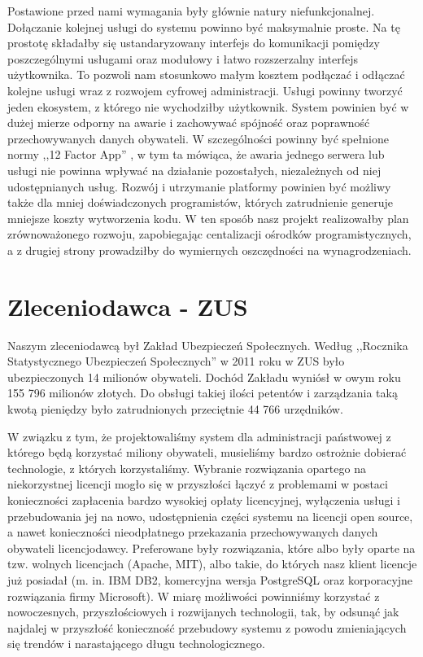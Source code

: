 \documentclass[licencjacka]{pracamgr}
\begin{document}
Postawione przed nami wymagania były głównie natury niefunkcjonalnej. Dołączanie kolejnej usługi do systemu
powinno być maksymalnie proste. Na tę prostotę składałby się ustandaryzowany interfejs do komunikacji pomiędzy
poszczególnymi usługami oraz modułowy i łatwo rozszerzalny interfejs użytkownika.
To pozwoli nam stosunkowo małym kosztem podłączać i odłączać kolejne usługi wraz z
rozwojem cyfrowej administracji. Usługi powinny tworzyć jeden ekosystem, z którego nie wychodziłby użytkownik. System
powinien być w dużej mierze odporny na awarie i zachowywać spójność oraz poprawność przechowywanych danych obywateli.
W szczególności powinny być spełnione normy ,,12 Factor App'' \cite{tfa}, w tym ta mówiąca, że awaria jednego serwera
lub usługi nie powinna wpływać na działanie pozostałych, niezależnych od niej udostępnianych usług.
Rozwój i utrzymanie platformy powinien być możliwy także dla mniej doświadczonych
programistów, których zatrudnienie generuje mniejsze koszty wytworzenia kodu. W ten sposób nasz projekt realizowałby plan
zrównoważonego rozwoju, zapobiegając centalizacji ośrodków programistycznych, a z drugiej strony prowadziłby do wymiernych
oszczędności na wynagrodzeniach.

\section{Zleceniodawca - ZUS}

Naszym zleceniodawcą był Zakład Ubezpieczeń Społecznych. Według ,,Rocznika
Statystycznego Ubezpieczeń Społecznych'' \cite{rocznik} w 2011 roku w ZUS było ubezpieczonych
14 milionów obywateli. Dochód Zakładu wyniósł w owym roku 155 796 milionów
złotych. Do obsługi takiej ilości petentów i zarządzania taką kwotą pieniędzy
było zatrudnionych przeciętnie 44 766 urzędników.

W związku z tym, że projektowaliśmy system dla administracji państwowej z
którego będą korzystać miliony obywateli, musieliśmy bardzo ostrożnie dobierać
technologie, z których korzystaliśmy. Wybranie rozwiązania opartego na
niekorzystnej licencji mogło się w przyszłości łączyć z problemami w postaci
konieczności zapłacenia bardzo wysokiej opłaty licencyjnej, wyłączenia usługi i
przebudowania jej na nowo, udostępnienia części systemu na licencji open source,
a nawet konieczności nieodpłatnego przekazania przechowywanych danych obywateli
licencjodawcy. Preferowane były rozwiązania, które albo były oparte na tzw. wolnych licencjach (Apache, MIT), albo takie, do
których nasz klient licencje już posiadał (m. in. IBM DB2, komercyjna wersja
PostgreSQL oraz korporacyjne rozwiązania firmy Microsoft). W miarę możliwości
powinniśmy korzystać z nowoczesnych, przyszłościowych i rozwijanych technologii,
tak, by odsunąć jak najdalej w przyszłość konieczność przebudowy systemu z
powodu zmieniających się trendów i narastającego długu technologicznego.
\end{document}
